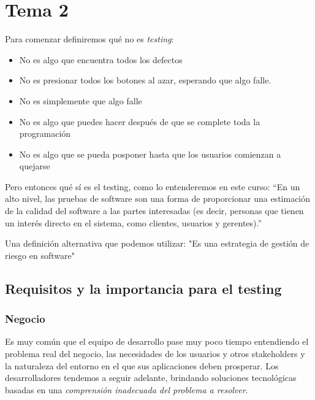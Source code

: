 \section*{Tema 2}
    Para comenzar definiremos qué no es \textit{testing}:
    \begin{itemize}
        \item No es algo que encuentra todos los defectos
        \item No es presionar todos los botones al azar, esperando que algo falle.
        \item No es simplemente que algo falle
        \item No es algo que puedes hacer después de que se complete toda la programación
        \item No es algo que se pueda posponer hasta que los usuarios comienzan a quejarse
    \end{itemize}
    
    Pero entonces qué sí es el testing, como lo entenderemos en este curso: “En un alto nivel, las pruebas de software son una forma de proporcionar una estimación de la calidad del software a las partes interesadas (es decir, personas que tienen un interés directo en el sistema, como clientes, usuarios y gerentes).”
    
    Una definición alternativa que podemos utilizar: "Es una estrategia de gestión de riesgo en software" 
    
    \subsection*{Requisitos y la importancia para el testing}     
    
        \subsubsection*{Negocio}
        
        Es muy común que el equipo de desarrollo pase muy poco tiempo entendiendo el problema real del negocio, las necesidades de los usuarios y otros stakeholders y la naturaleza del entorno en el que sus aplicaciones deben prosperar. Los desarrolladores tendemos a seguir adelante, brindando soluciones tecnológicas basadas en una  \textit{comprensión inadecuada del problema a resolver}.
        
